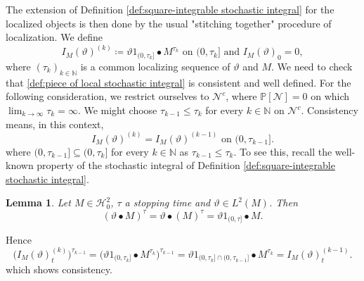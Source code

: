 \documentclass[11pt,a4paper,twoside,openany]{report}
\numberwithin{equation}{section}
\theoremstyle{plain} %
\newtheorem{lemma}[theorem]{Lemma}
\theoremstyle{definition} %
\theoremstyle{remark} %
\begin{document}
The extension of Definition \ref{def:square-integrable stochastic integral} for the localized objects is then done by the usual "stitching together" procedure of localization. We define 
\begin{equation}\label{def:piece of local stochastic integral}
    I_M(\vartheta)^{(k)}\coloneqq \vartheta1_{(0,\tau_k]}\bullet M^{\tau_k} \text{ on } (0,\tau_k] \text{ and } I_M(\vartheta)_0=0 ,
\end{equation}
where \((\tau_k)_{k\in\mathbb{N}}\) is a common localizing sequence of \(\vartheta\) and \(M\). We need to check that \eqref{def:piece of local stochastic integral} is consistent and well defined. For the following consideration, we restrict ourselves to \(\mathcal{N}^c\), where \(\mathbb{P}[\mathcal{N}]=0\) on which \(\lim_{k\to\infty}\tau_k=\infty\). We might choose \(\tau_{k-1}\leq\tau_{k}\) for every \(k\in\mathbb{N}\) on \(\mathcal{N}^c\). Consistency means, in this context,
\begin{equation*}
    I_M(\vartheta)^{(k)}=I_M(\vartheta)^{(k-1)}\text{ on } (0,\tau_{k-1}].
\end{equation*}
where \((0,\tau_{k-1}]\subseteq(0,\tau_{k}]\)
for every \(k\in\mathbb{N}\) as \(\tau_{k-1}\leq \tau_{k}\). To see this, recall the well-known property of the stochastic integral of Definition \ref{def:square-integrable stochastic integral}.
\begin{lemma}\label{lemma:stopping stochastic integrals}
    Let \(M\in\mathcal{H}_0^2\), \(\tau\) a stopping time and \(\vartheta\in L^2(M)\). Then
\begin{equation*}
    (\vartheta\bullet M)^{\tau}=\vartheta\bullet(M)^{\tau}=\vartheta1_{(0,\tau]}\bullet M.
\end{equation*}
\end{lemma}
Hence
\begin{equation*}
\big(I_M(\vartheta)^{(k)}_t\big)^{\tau_{k-1}}=\big(\vartheta1_{(0,\tau_k]}\bullet M^{\tau_k}\big)^{\tau_{k-1}}=\vartheta1_{(0,\tau_k]\cap(0,\tau_{k-1}]}\bullet M^{\tau_k}=I_M(\vartheta)^{(k-1)}_t.
\end{equation*}
which shows consistency. 
\end{document}
